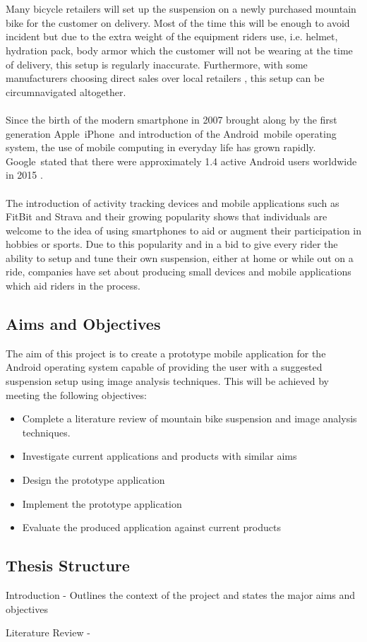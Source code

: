 	\\\\
	Many bicycle retailers will set up the suspension on a newly purchased mountain bike for the customer on delivery. Most of the time this will be enough to avoid incident but due to the extra weight of the equipment riders use, i.e. helmet, hydration pack, body armor which the customer will not be wearing at the time of delivery, this setup is regularly inaccurate. Furthermore, with some manufacturers choosing direct sales over local retailers \citep{roseonline, ytonline}, this setup can be circumnavigated altogether.
	\\\\
	Since the birth of the modern smartphone in 2007 brought along by the first generation Apple\textregistered\ iPhone\textregistered\ and introduction of the Android\texttrademark\ mobile operating system, the use of mobile computing in everyday life has grown rapidly. Google\texttrademark\ stated that there were approximately 1.4 active Android users worldwide in 2015 \citep{androidusers}.
	\\\\
	The introduction of activity tracking devices and mobile applications such as FitBit \citep{fitbit} and Strava \citep{strava} and their growing popularity \citep{apppopularity} shows that individuals are welcome to the idea of using smartphones to aid or augment their participation in hobbies or sports. Due to this popularity and in a bid to give every rider the ability to setup and tune their own suspension, either at home or while out on a ride, companies have set about producing small devices \citep{sussmybike, shockwiztrademark} and mobile applications \citep{foxird} which aid riders in the process.
\subsection{Aims and Objectives}
	The aim of this project is to create a prototype mobile application for the Android operating system capable of providing the user with a suggested suspension setup using image analysis techniques. This will be achieved by meeting the following objectives:
	\begin{itemize}
		\item Complete a literature review of mountain bike suspension and image analysis techniques.
		\item Investigate current applications and products with similar aims
		\item Design the prototype application
		\item Implement the prototype application 
		\item Evaluate the produced application against current products
	\end{itemize}
\subsection{Thesis Structure}
\begin{chapterList}
	\item Introduction - Outlines the context of the project and states the major aims and objectives
	\item Literature Review - 
	\item
\end{chapterList}
	
